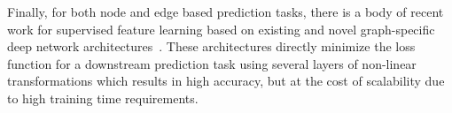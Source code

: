 Finally, for both node and edge based prediction tasks, there is a body of recent work for supervised feature learning based on existing and novel graph-specific deep network architectures~\cite{li-icdm2014, li-icdm2014-2, li2015gated, tian-aaai2014, zhai-sdm2015}. These architectures directly minimize the loss function for a downstream prediction task using several layers of non-linear transformations which results in high accuracy, but at the cost of scalability due to high training time requirements.


